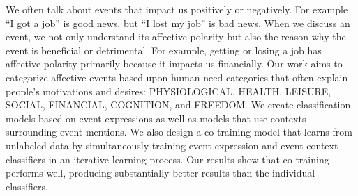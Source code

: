 We often talk about events that impact us positively or negatively. For example ``I got a job'' is good news, but ``I lost my job'' is bad news. When we discuss an event, we not only understand its affective polarity but also the reason why the event is beneficial or detrimental. For example, getting or losing a job has affective polarity primarily because it impacts us financially. Our work aims to categorize affective events based upon human need categories that often explain people's motivations and desires: PHYSIOLOGICAL, HEALTH, LEISURE, SOCIAL, FINANCIAL, COGNITION, and FREEDOM. We create classification models based on event expressions as well as models that use contexts surrounding event mentions. We also design a co-training model that learns from unlabeled data by simultaneously training event expression and event context classifiers in an iterative learning process. Our results show that co-training performs well, producing substantially better results than the individual classifiers.

